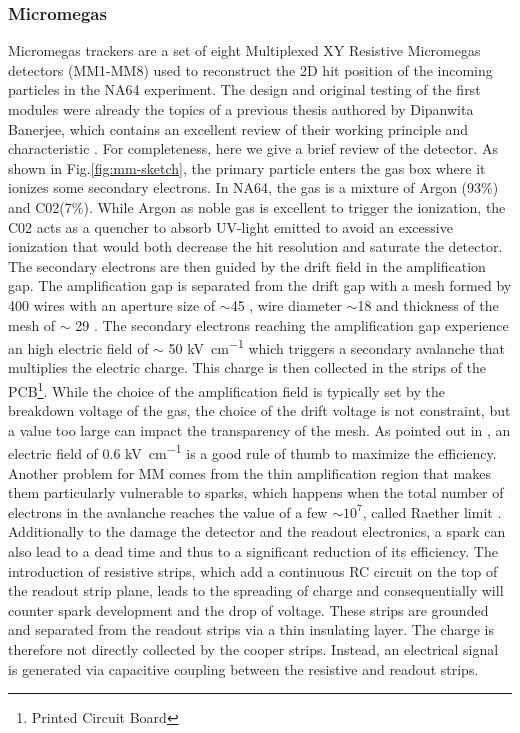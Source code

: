 \subsubsection{Micromegas}

Micromegas trackers are a set of eight Multiplexed XY Resistive Micromegas detectors (MM1-MM8) used to reconstruct the 2D hit position of the incoming particles in the NA64 experiment. The design and original testing of the first modules were already the topics of a previous thesis authored by Dipanwita Banerjee, which contains an excellent review of their working principle and characteristic \cite{dbanerjee-thesis}. For completeness, here we give a brief review of the detector. As shown in Fig.\ref{fig:mm-sketch}, the primary particle enters the gas box where it ionizes some secondary electrons. In NA64, the gas is a mixture of Argon (93\%) and C02(7\%). While Argon as noble gas is excellent to trigger the ionization, the C02 acts as a quencher to absorb UV-light emitted to avoid an excessive ionization that would both decrease the hit resolution and saturate the detector. The secondary electrons are then guided by the drift field in the amplification gap. The amplification gap is separated from the drift gap with a mesh formed by 400 wires with an aperture size of $\sim$45 \mum, wire diameter $\sim$18 \mum and thickness of the mesh of $\sim$ 29 \mum. The secondary electrons reaching the amplification gap experience an high electric field of $\sim$ 50 \si{\kilo\volt\per\centi\metre} which triggers a secondary avalanche that multiplies the electric charge. This charge is then collected in the strips of the PCB\footnote{Printed Circuit Board}. While the choice of the amplification field is typically set by the breakdown voltage of the gas, the choice of the drift voltage is not constraint, but a value too large can impact the transparency of the mesh. As pointed out in \cite{Bortfeldt:2014vvt}, an electric field of 0.6 \si{\kilo\volt\per\centi\metre} is a good rule of thumb to maximize the efficiency. Another problem for MM comes from the thin amplification region that makes them particularly vulnerable to sparks, which happens when the total number of electrons in the avalanche reaches the value of a few $\sim 10^7$, called Raether limit \cite{BAY2002162,BRESSAN1999321,Raether:102989}. Additionally to the damage the detector and the readout electronics, a spark can also lead to a dead time and thus to a significant reduction of its efficiency. The introduction of resistive strips, which add a continuous RC circuit on the top of the readout strip plane, leads to the spreading of charge and consequentially will counter spark development and the drop of voltage. These strips are grounded and separated from the readout strips via a thin insulating layer. The charge is therefore not directly collected by the cooper strips. Instead, an electrical signal is generated via capacitive coupling between the resistive and readout strips.

